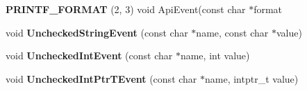 \begin{DoxyCompactItemize}
\item 
{\bfseries P\+R\+I\+N\+T\+F\+\_\+\+F\+O\+R\+M\+AT} (2, 3) void Api\+Event(const char $\ast$format\hypertarget{classv8_1_1internal_1_1_logger_a45dd48d08b020c118b1a840e34ba9238}{}\label{classv8_1_1internal_1_1_logger_a45dd48d08b020c118b1a840e34ba9238}

\item 
void {\bfseries Unchecked\+String\+Event} (const char $\ast$name, const char $\ast$value)\hypertarget{classv8_1_1internal_1_1_logger_aaab7a6b583caeacf6fc43217b75c0599}{}\label{classv8_1_1internal_1_1_logger_aaab7a6b583caeacf6fc43217b75c0599}

\item 
void {\bfseries Unchecked\+Int\+Event} (const char $\ast$name, int value)\hypertarget{classv8_1_1internal_1_1_logger_a663642e7a702ce76ce27377af066c913}{}\label{classv8_1_1internal_1_1_logger_a663642e7a702ce76ce27377af066c913}

\item 
void {\bfseries Unchecked\+Int\+Ptr\+T\+Event} (const char $\ast$name, intptr\+\_\+t value)\hypertarget{classv8_1_1internal_1_1_logger_a11d7d13e90ba96830eb6749907bae385}{}\label{classv8_1_1internal_1_1_logger_a11d7d13e90ba96830eb6749907bae385}

\end{DoxyCompactItemize}
